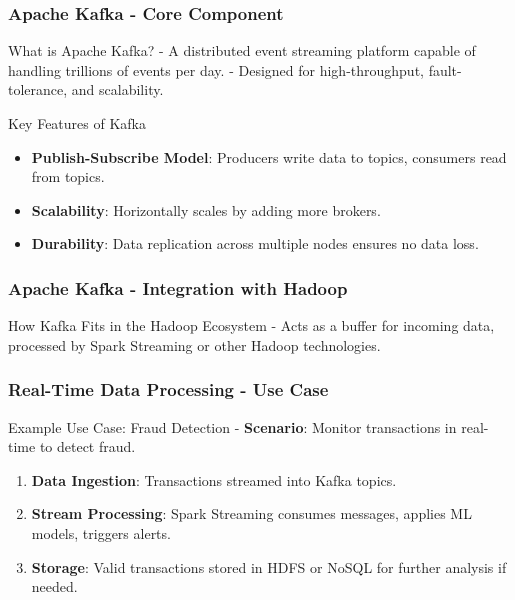 \documentclass[aspectratio=169]{beamer}
\begin{document}
\begin{frame}[fragile]
    \frametitle{Apache Kafka - Core Component}
    \begin{block}{What is Apache Kafka?}
        - A distributed event streaming platform capable of handling trillions of events per day.
        - Designed for high-throughput, fault-tolerance, and scalability.
    \end{block}
    \begin{block}{Key Features of Kafka}
        \begin{itemize}
            \item \textbf{Publish-Subscribe Model}: Producers write data to topics, consumers read from topics.
            \item \textbf{Scalability}: Horizontally scales by adding more brokers.
            \item \textbf{Durability}: Data replication across multiple nodes ensures no data loss.
        \end{itemize}
    \end{block}
\end{frame}

\begin{frame}[fragile]
    \frametitle{Apache Kafka - Integration with Hadoop}
    \begin{block}{How Kafka Fits in the Hadoop Ecosystem}
        - Acts as a buffer for incoming data, processed by Spark Streaming or other Hadoop technologies.
    \end{block}
\end{frame}

\begin{frame}[fragile]
    \frametitle{Real-Time Data Processing - Use Case}
    \begin{block}{Example Use Case: Fraud Detection}
        - \textbf{Scenario}: Monitor transactions in real-time to detect fraud.
        \begin{enumerate}
            \item \textbf{Data Ingestion}: Transactions streamed into Kafka topics.
            \item \textbf{Stream Processing}: Spark Streaming consumes messages, applies ML models, triggers alerts.
            \item \textbf{Storage}: Valid transactions stored in HDFS or NoSQL for further analysis if needed.
        \end{enumerate}
    \end{block}
\end{frame}
\end{document}
